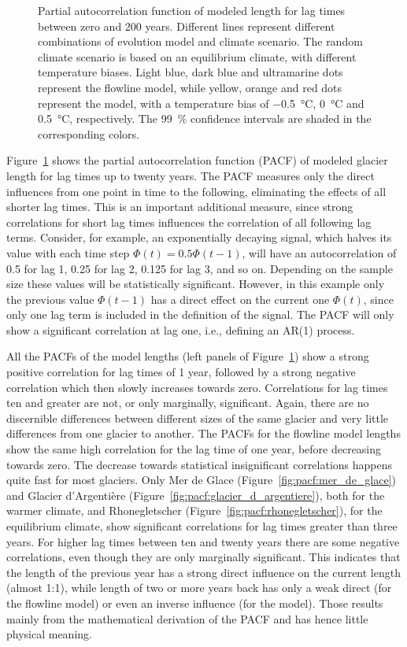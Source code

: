 \begin{figure}[htp]
        \caption{Partial autocorrelation function of modeled length for lag times between zero and 200 years. Different lines represent different combinations of evolution model and climate scenario.
        The random climate scenario is based on an equilibrium climate, with different temperature biases.
        Light blue, dark blue and ultramarine dots represent the flowline model, while yellow, orange and red dots represent the \vas{} model, with a temperature bias of \SI{-.5}{\celsius}, \SI{0}{\celsius} and \SI{+.5}{\celsius}, respectively.
        The \SI{99}{\percent} confidence intervals are shaded in the corresponding colors.}
        \label{fig:pacf}
      \end{figure}

      Figure~\ref{fig:pacf} shows the partial autocorrelation function (PACF) of modeled glacier length for lag times up to twenty years. The PACF measures only the direct influences from one point in time to the following, eliminating the effects of all shorter lag times. This is an important additional measure, since strong correlations for short lag times influences the correlation of all following lag terms. Consider, for example, an exponentially decaying signal, which halves its value with each time step $\Phi(t) = 0.5 \Phi(t-1)$, will have an autocorrelation of 0.5 for lag 1, 0.25 for lag 2, 0.125 for lag 3, and so on. Depending on the sample size these values will be statistically significant. However, in this example only the previous value $\Phi(t-1)$ has a direct effect on the current one $\Phi(t)$, since only one lag term is included in the definition of the signal. The PACF will only show a significant correlation at lag one, i.e., defining an AR(1) process.

      All the PACFs of the \vas{} model lengths (left panels of Figure~\ref{fig:pacf}) show a strong positive correlation for lag times of 1 year, followed by a strong negative correlation which then slowly increases towards zero. Correlations for lag times ten and greater are not, or only marginally, significant. Again, there are no discernible differences between different sizes of the same glacier and very little differences from one glacier to another. The PACFs for the flowline model lengths show the same high correlation for the lag time of one year, before decreasing towards zero. The decrease towards statistical insignificant correlations happens quite fast for most glaciers. Only Mer de Glace (Figure~\ref{fig:pacf:mer_de_glace}) and Glacier d'Argentière (Figure~\ref{fig:pacf:glacier_d_argentiere}), both for the warmer climate, and Rhonegletscher (Figure~\ref{fig:pacf:rhonegletscher}), for the equilibrium climate, show significant correlations for lag times greater than three years. For higher lag times between ten and twenty years there are some negative correlations, even though they are only marginally significant. This indicates that the length of the previous year has a strong direct influence on the current length (almost 1:1), while length of two or more years back has only a weak direct (for the flowline model) or even an inverse influence (for the \vas model). Those results mainly from the mathematical derivation of the PACF and has hence little physical meaning.

